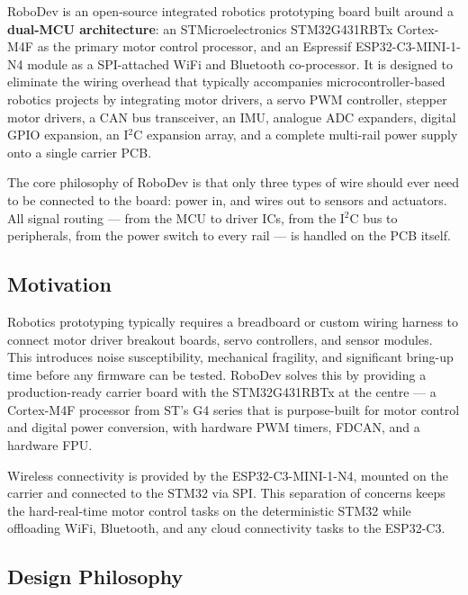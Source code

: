 \documentclass[11pt,a4paper]{article}
\begin{document}
RoboDev is an open-source integrated robotics prototyping board built around a \textbf{dual-MCU architecture}: an STMicroelectronics STM32G431RBTx Cortex-M4F as the primary motor control processor, and an Espressif ESP32-C3-MINI-1-N4 module as a SPI-attached WiFi and Bluetooth co-processor. It is designed to eliminate the wiring overhead that typically accompanies microcontroller-based robotics projects by integrating motor drivers, a servo PWM controller, stepper motor drivers, a CAN bus transceiver, an IMU, analogue ADC expanders, digital GPIO expansion, an I$^2$C expansion array, and a complete multi-rail power supply onto a single carrier PCB.

The core philosophy of RoboDev is that only three types of wire should ever need to be connected to the board: power in, and wires out to sensors and actuators. All signal routing --- from the MCU to driver ICs, from the I$^2$C bus to peripherals, from the power switch to every rail --- is handled on the PCB itself.

\subsection{Motivation}

Robotics prototyping typically requires a breadboard or custom wiring harness to connect motor driver breakout boards, servo controllers, and sensor modules. This introduces noise susceptibility, mechanical fragility, and significant bring-up time before any firmware can be tested. RoboDev solves this by providing a production-ready carrier board with the STM32G431RBTx at the centre --- a Cortex-M4F processor from ST's G4 series that is purpose-built for motor control and digital power conversion, with hardware PWM timers, FDCAN, and a hardware FPU.

Wireless connectivity is provided by the ESP32-C3-MINI-1-N4, mounted on the carrier and connected to the STM32 via SPI. This separation of concerns keeps the hard-real-time motor control tasks on the deterministic STM32 while offloading WiFi, Bluetooth, and any cloud connectivity tasks to the ESP32-C3.

\subsection{Design Philosophy}
\end{document}
